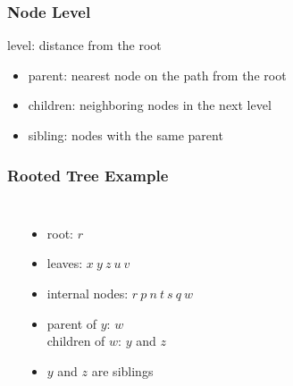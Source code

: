 \documentclass[dvipsnames]{beamer}
\begin{document}
\begin{frame}
  \frametitle{Node Level}

  \begin{definition}
    \alert{level}: distance from the root
  \end{definition}

  \pause
  \begin{itemize}
    \item \alert{parent}: nearest node on the path from the root
    \item \alert{children}: neighboring nodes in the next level
    \item \alert{sibling}: nodes with the same parent
  \end{itemize}
\end{frame}

\begin{frame}
  \frametitle{Rooted Tree Example}

  \begin{example}
    \begin{columns}
      \begin{center}
      \end{center}

      \pause
      \begin{itemize}
        \item root: $r$
        \item leaves: $x ~ y ~ z ~ u ~ v$
        \item internal nodes: $r ~ p ~ n ~ t ~ s ~ q ~ w$
        \item parent of $y$: $w$\\
          children of $w$: $y$ and $z$\\
	\item $y$ and $z$ are siblings
      \end{itemize}
    \end{columns}
  \end{example}
\end{frame}
\end{document}
